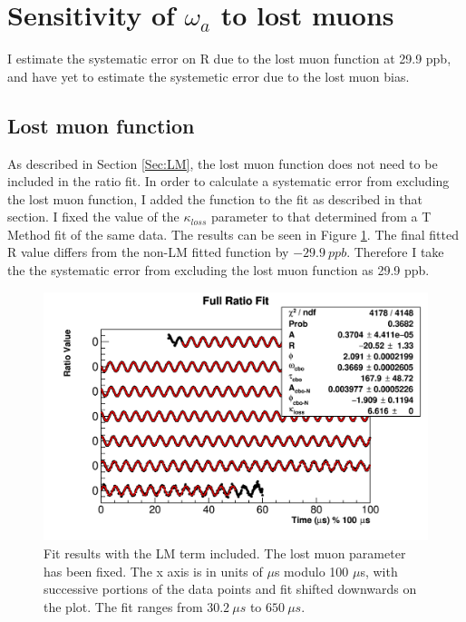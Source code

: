 \section{Sensitivity of \texorpdfstring{$\omega_{a}$}{} to lost muons}
\label{Sec:SystematicLM}

	I estimate the systematic error on R due to the lost muon function at 29.9 ppb, and have yet to estimate the systemetic error due to the lost muon bias.

	\subsection{Lost muon function}
	\label{SubSec:LMFunc}

		As described in Section \ref{Sec:LM}, the lost muon function does not need to be included in the ratio fit. In order to calculate a systematic error from excluding the lost muon function, I added the function to the fit as described in that section. I fixed the value of the $\kappa_{loss}$ parameter to that determined from a T Method fit of the same data. The results can be seen in Figure \ref{fig:LMModuloPlot}. The final fitted R value differs from the non-LM fitted function by $\SI{-29.9}{ppb}$. Therefore I take the the systematic error from excluding the lost muon function as 29.9 ppb.

		\begin{figure}[]
			\centering
			\includegraphics[width=\textwidth]{ratioCBO_moduloPlot-lostmuonsfixed}
		    \caption[LMModuloPlot]{Fit results with the LM term included. The lost muon parameter has been fixed. The x axis is in units of $\mu$s modulo 100 $\mu$s, with successive portions of the data points and fit shifted downwards on the plot. The fit ranges from $\SI{30.2}{\mu s}$ to $\SI{650}{\mu s}$.}
		    \label{fig:LMModuloPlot}
		\end{figure}


